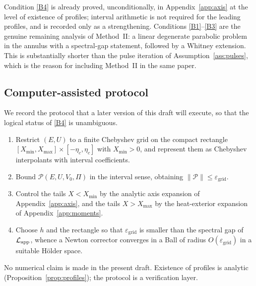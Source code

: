 \begin{remark}
\label{rem:assII-status}
Condition \ref{B4} is already proved, unconditionally, in Appendix~\ref{app:axis} at the level of existence of profiles; interval arithmetic is not required for the leading profiles, and is recorded only as a strengthening. Conditions \ref{B1}--\ref{B3} are the genuine remaining analysis of Method~II: a linear degenerate parabolic problem in the annulus with a spectral-gap statement, followed by a {W}hitney extension. This is substantially shorter than the pulse iteration of Assumption~\ref{ass:pulses}, which is the reason for including Method~II in the same paper.
\end{remark}

\subsection{Computer-assisted protocol}
\label{sec:CAP}

We record the protocol that a later version of this draft will execute, so that the logical status of \ref{B4} is unambiguous.

\begin{construction}
\label{con:interval}
\begin{enumerate}[leftmargin=1.2em]
\item Restrict $(E,U)$ to a finite {C}hebyshev grid on the compact rectangle $[X_{\min},X_{\max}]\times[-\eta_c,\eta_c]$ with $X_{\min}>0$, and represent them as {C}hebyshev interpolants with interval coefficients.
\item Bound $\mathcal P(E,U,V_0,\Pi)$ in the interval sense, obtaining $\|\mathcal P\|\le \varepsilon_{\mathrm{grid}}$.
\item Control the tails $X<X_{\min}$ by the analytic axis expansion of Appendix~\ref{app:axis}, and the tails $X>X_{\max}$ by the heat-exterior expansion of Appendix~\ref{app:moments}.
\item Choose $h$ and the rectangle so that $\varepsilon_{\mathrm{grid}}$ is smaller than the spectral gap of $\mathcal L_{\mathrm{app}}$, whence a {N}ewton corrector converges in a {B}all of radius $O(\varepsilon_{\mathrm{grid}})$ in a suitable {H}{\"o}lder space.
\end{enumerate}
\end{construction}

No numerical claim is made in the present draft. Existence of profiles is analytic (Proposition~\ref{prop:profiles}); the protocol is a verification layer.

